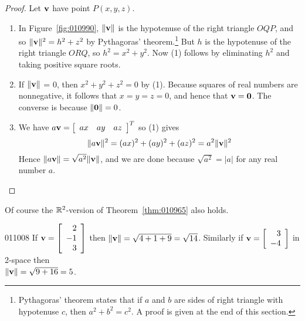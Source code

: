 \begin{proof} Let $\textbf{v}$ have point $P(x, y, z)$.
\begin{enumerate}
\item In Figure~\ref{fig:010990}, $\|\textbf{v}\|$ is the hypotenuse of the right triangle $OQP$, and so $\|\textbf{v}\|^2 = h^{2} + z^{2}$ by Pythagoras' theorem.\footnote{Pythagoras' theorem states that if $a$ and $b$ are sides of right triangle with hypotenuse $c$, then $a^{2} + b^{2} = c^{2}$. A proof is given at the end of this section.}
 But $h$ is the hypotenuse of the right triangle $ORQ$, so $h^{2} = x^{2} + y^{2}$. Now (1) follows by eliminating $h^{2}$ and taking positive square roots.

\item If $\|\textbf{v}\|$ = 0, then $x^{2} + y^{2} + z^{2} = 0$ by (1). Because squares of real numbers are nonnegative, it follows that $x = y = z = 0$, and hence that $\textbf{v} = \textbf{0}$. The converse is because $\|\textbf{0}\| = 0$.

\item We have $a\textbf{v} = \left[ \begin{array}{ccc} ax &  ay & az \end{array}\right]^{T}$ so (1) gives 
\begin{equation*}
\| a\textbf{v}\|^2 = (ax)^2 + (ay)^2 + (az)^2 = a^{2}\|\textbf{v}\|^2
\end{equation*}
 Hence $\| a\textbf{v}\| = \sqrt{a^2} \| \textbf{v} \|$, and we are done because $\sqrt{a^2} = |a|$ for any real number $a$.
\end{enumerate}
\vspace*{-2em}\end{proof}

\noindent Of course the $\mathbb{R}^2$-version of Theorem~\ref{thm:010965} also holds.

\newpage
\begin{example}{}{011008}
If
$\textbf{v} = \left[
\begin{array}{r}
2 \\
-1 \\
3 
\end{array}
\right]$ 
 then $\| \textbf{v} \| = \sqrt{4 + 1 + 9} = \sqrt{14}$. Similarly if 
$\textbf{v} = \left[
\begin{array}{r}
3 \\
-4  
\end{array}
\right]$ 
in 2-space then \\$\| \textbf{v} \| = \sqrt{9 + 16} = 5$.
\end{example}

